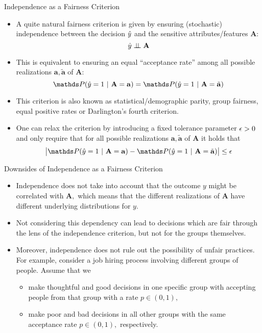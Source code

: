 \documentclass[11pt,compress,t,notes=noshow, xcolor=table]{beamer}
\newcommand{\sens}{\mathbf{A}} %
\newcommand{\ba}{\mathbf{a}}
\newcommand{\batilde}{\tilde{\mathbf{a}}}
\newcommand{\indep}{\perp \!\!\! \perp} %
\begin{document}
\begin{vbframe}{Independence as a Fairness Criterion}
	\small{
		\begin{itemize}
			\item A quite natural fairness criterion is given by ensuring (stochastic) independence between the decision $\hat{y}$ and the sensitive attributes/features $\sens:$
%			
			$$	\yh \indep \sens	$$
%			
			\item This is equivalent to ensuring an equal ``acceptance rate'' among all possible realizations $\ba,\batilde$ of $\sens:$
%			
			$$  \P(  \yh = 1 ~|~ \sens = \ba ) = \P(  \yh = 1 ~|~ \sens = \batilde )$$
			\item This criterion is also known as statistical/demographic parity, group fairness, equal positive rates or Darlington's fourth criterion.
%			
			\item One can relax the criterion by introducing a fixed tolerance parameter $\epsilon>0$ and only require that for all possible realizations $\ba,\batilde$ of $\sens$ it holds that
%			
			$$  \big|  \P(  \yh = 1 ~|~ \sens = \ba ) - \P(  \yh = 1 ~|~ \sens = \batilde ) \big| \leq \eps $$
%		
		\end{itemize}
%	
	}
\end{vbframe}


\begin{vbframe}{Downsides of Independence as a Fairness Criterion}
	\small{
		\begin{itemize}
			\item Independence does not take into account that the outcome $y$ might be correlated with $\sens,$ which means that the different realizations of $\sens$ have different underlying distributions for $y.$
			\item Not considering this dependency can lead to decisions which are fair through the lens of the independence criterion, but not for the groups themselves. 
%			
			\item Moreover, independence does not rule out the possibility of unfair practices. For example, consider a job hiring process involving different groups of people. Assume that we 
%			
			\begin{itemize}
				\small
%				
				\item make thoughtful and good decisions in one specific group with accepting people from that group with a rate $p\in(0,1),$
%				
				\item make poor and bad decisions in all other groups with the same acceptance rate $p\in(0,1),$ respectively.
%							
			\end{itemize}	
%		
		\end{itemize}
	}
\end{vbframe}
\end{document}
